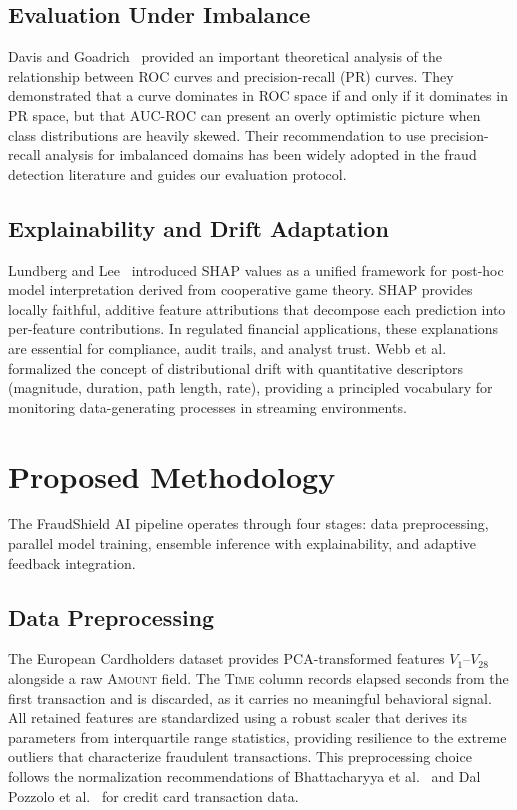 \documentclass[conference,10pt]{IEEEtran}
\begin{document}
\subsection{Evaluation Under Imbalance}
Davis and Goadrich~\cite{davis2006relationship} provided an important theoretical analysis of the relationship between ROC curves and precision-recall (PR) curves. They demonstrated that a curve dominates in ROC space if and only if it dominates in PR space, but that AUC-ROC can present an overly optimistic picture when class distributions are heavily skewed. Their recommendation to use precision-recall analysis for imbalanced domains has been widely adopted in the fraud detection literature and guides our evaluation protocol.

\subsection{Explainability and Drift Adaptation}
Lundberg and Lee~\cite{lundberg2017unified} introduced SHAP values as a unified framework for post-hoc model interpretation derived from cooperative game theory. SHAP provides locally faithful, additive feature attributions that decompose each prediction into per-feature contributions. In regulated financial applications, these explanations are essential for compliance, audit trails, and analyst trust. Webb et al.~\cite{webb2016characterizing} formalized the concept of distributional drift with quantitative descriptors (magnitude, duration, path length, rate), providing a principled vocabulary for monitoring data-generating processes in streaming environments.

\section{Proposed Methodology}

The FraudShield AI pipeline operates through four stages: data preprocessing, parallel model training, ensemble inference with explainability, and adaptive feedback integration.

\subsection{Data Preprocessing}
The European Cardholders dataset provides PCA-transformed features $V_1$--$V_{28}$ alongside a raw \textsc{Amount} field. The \textsc{Time} column records elapsed seconds from the first transaction and is discarded, as it carries no meaningful behavioral signal. All retained features are standardized using a robust scaler that derives its parameters from interquartile range statistics, providing resilience to the extreme outliers that characterize fraudulent transactions. This preprocessing choice follows the normalization recommendations of Bhattacharyya et al.~\cite{bhattacharyya2011data} and Dal Pozzolo et al.~\cite{dal2014learned} for credit card transaction data.
\end{document}
